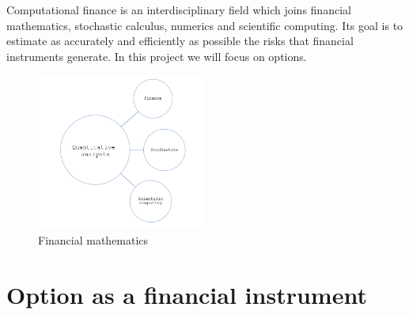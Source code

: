 \documentclass[a4paper]{report}
\begin{document}
Computational finance is an interdisciplinary field which joins financial mathematics, stochastic calculus, numerics and scientific computing. Its goal is to estimate as accurately and efficiently as possible the risks that financial instruments generate. In this project we will focus on options.
\begin{figure}[H]
    \centering
    \includegraphics[width=0.5\textwidth]{dia.png}
    \caption{Financial mathematics}
\end{figure}


\section{Option as a financial instrument}
\end{document}
